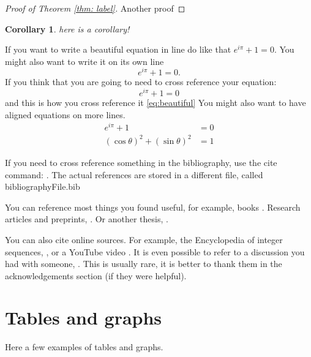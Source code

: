\documentclass[12pt, a4paper, twoside]{article}
\theoremstyle{definition}
\theoremstyle{plain}
\newtheorem{corollary}[definition]{Corollary}
\theoremstyle{remark}
\begin{document}
\begin{proof}[Proof of Theorem \ref{thm: label}]
Another proof
\end{proof}


\begin{corollary}
here is a corollary!
\end{corollary}

If you want to write a beautiful equation in line do like that $e^{i\pi}+1=0$.
You might also want to write it on its own line
\[
e^{i\pi}+1=0.
\]
If you think that you are going to need to cross reference your equation:
\begin{equation}\label{eq:beautiful}
e^{i\pi}+1=0
\end{equation}
and this is how you cross reference it \eqref{eq:beautiful}
You might also want to have aligned equations on more lines.
\begin{align}
    e^{i\pi}+1&=0\\
    (\cos\theta)^2+(\sin\theta)^2 &=1
\end{align}

If you need to cross reference something in the bibliography, use the cite command: \cite[p. 45]{Biggs2002}. 
The actual references are stored in a different file, called bibliographyFile.bib 

You can reference most things you found useful,
for example, books \cite{Biggs2002,Knuth1998ArtOfProgramming,LascouxPolynomialsBook}.
Research articles and preprints, \cite{AlexanderssonSulzgruber2019,Sherman2015x}.
Or another thesis, \cite{Teff2013}.

You can also cite online sources. For example, the Encyclopedia of integer sequences, \cite{OEIS},
or a YouTube video \cite{Bazett2018yt}. 
It is even possible to refer to a discussion you had with someone, \cite{PrivateCommunicationWithJustin}.
This is usually rare, it is better to thank them in the acknowledgements section (if they were helpful).



\clearpage{\thispagestyle{empty}\cleardoublepage}
\section{Tables and graphs}
Here a few examples of tables and graphs.
\end{document}
